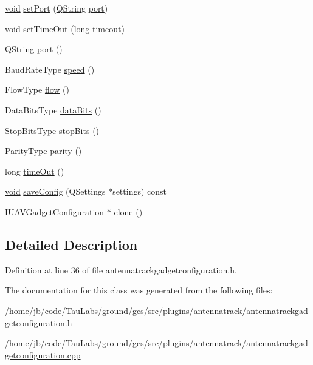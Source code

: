 \begin{DoxyCompactItemize}
\item 
\hyperlink{group___u_a_v_objects_plugin_ga444cf2ff3f0ecbe028adce838d373f5c}{void} \hyperlink{group___antenna_track_gadget_plugin_gac2bdc7b975f53784d49e7d2bb484742e}{set\-Port} (\hyperlink{group___u_a_v_objects_plugin_gab9d252f49c333c94a72f97ce3105a32d}{\-Q\-String} \hyperlink{classport}{port})
\item 
\hyperlink{group___u_a_v_objects_plugin_ga444cf2ff3f0ecbe028adce838d373f5c}{void} \hyperlink{group___antenna_track_gadget_plugin_gacf4c8b3c4cbd9235d1e80ddb544194f3}{set\-Time\-Out} (long timeout)
\item 
\hyperlink{group___u_a_v_objects_plugin_gab9d252f49c333c94a72f97ce3105a32d}{\-Q\-String} \hyperlink{group___antenna_track_gadget_plugin_ga191565f9ae925e1b1b00f3b51254d102}{port} ()
\item 
\-Baud\-Rate\-Type \hyperlink{group___antenna_track_gadget_plugin_ga9f04acbb3e66e621c35afaa756e61cb0}{speed} ()
\item 
\-Flow\-Type \hyperlink{group___antenna_track_gadget_plugin_ga6c02451beb6f94db4d3c67bd13fa9c3e}{flow} ()
\item 
\-Data\-Bits\-Type \hyperlink{group___antenna_track_gadget_plugin_gac5cb692c8bb0b91960b4697df1d68401}{data\-Bits} ()
\item 
\-Stop\-Bits\-Type \hyperlink{group___antenna_track_gadget_plugin_ga9cb31ed1936c27264a65a79f45ca67b9}{stop\-Bits} ()
\item 
\-Parity\-Type \hyperlink{group___antenna_track_gadget_plugin_ga24493de658f97012f89d15d6058bc1f7}{parity} ()
\item 
long \hyperlink{group___antenna_track_gadget_plugin_gaeecdda26c0e04883d4ddb31cca80a3ca}{time\-Out} ()
\item 
\hyperlink{group___u_a_v_objects_plugin_ga444cf2ff3f0ecbe028adce838d373f5c}{void} \hyperlink{group___antenna_track_gadget_plugin_ga5666ade504f914b0118bb6cc51919d95}{save\-Config} (\-Q\-Settings $\ast$settings) const 
\item 
\hyperlink{group___core_plugin_gacdfdf0b1e39b5002472b76b6564ce51f}{\-I\-U\-A\-V\-Gadget\-Configuration} $\ast$ \hyperlink{group___antenna_track_gadget_plugin_ga75fc3a4d561ce3996236b59c1cde51f3}{clone} ()
\end{DoxyCompactItemize}


\subsection{\-Detailed \-Description}


\-Definition at line 36 of file antennatrackgadgetconfiguration.\-h.



\-The documentation for this class was generated from the following files\-:\begin{DoxyCompactItemize}
\item 
/home/jb/code/\-Tau\-Labs/ground/gcs/src/plugins/antennatrack/\hyperlink{antennatrackgadgetconfiguration_8h}{antennatrackgadgetconfiguration.\-h}\item 
/home/jb/code/\-Tau\-Labs/ground/gcs/src/plugins/antennatrack/\hyperlink{antennatrackgadgetconfiguration_8cpp}{antennatrackgadgetconfiguration.\-cpp}\end{DoxyCompactItemize}
